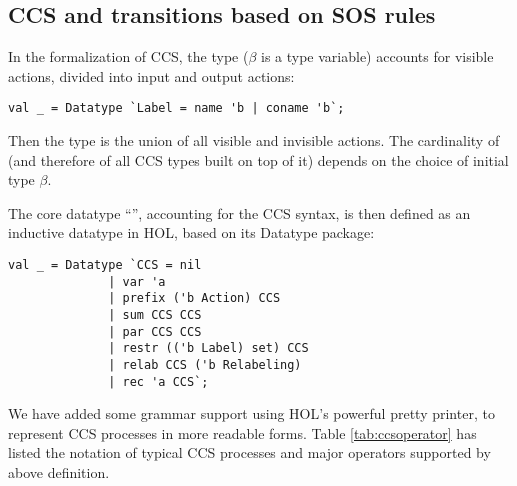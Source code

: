 
\subsection{CCS and transitions based on SOS rules}

In the formalization of CCS, 
the type  ($\beta$ is a
type variable) accounts for visible actions, divided into input
and output actions:
\begin{lstlisting}
val _ = Datatype `Label = name 'b | coname 'b`;
\end{lstlisting}
Then
the type  is the
union of all visible and invisible actions. The cardinality of
 (and therefore of all
CCS types built on top of it) 
 depends on the choice of initial  type $\beta$.



The core datatype ``'', accounting for the CCS syntax,  is then defined as an inductive
datatype in HOL, based on its Datatype package:
\begin{lstlisting}
val _ = Datatype `CCS = nil
		      | var 'a
		      | prefix ('b Action) CCS
		      | sum CCS CCS
		      | par CCS CCS
		      | restr (('b Label) set) CCS
		      | relab CCS ('b Relabeling)
		      | rec 'a CCS`;
\end{lstlisting}

We have added some  grammar support using HOL's powerful pretty printer, to represent CCS
processes in more readable forms. Table \ref{tab:ccsoperator} has listed the notation of typical CCS processes and
major operators supported by above definition.


